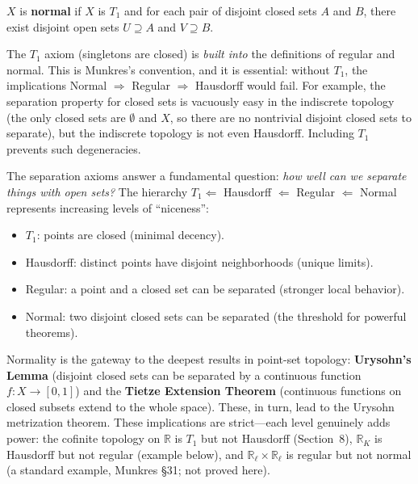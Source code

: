 \documentclass[11pt]{report}
\begin{document}
\begin{defbox}[Normal]
$X$ is \textbf{normal} if $X$ is $T_1$ and for each pair of disjoint closed sets $A$ and $B$, there exist disjoint open sets $U \supseteq A$ and $V \supseteq B$.
\end{defbox}

\begin{rembox}
The $T_1$ axiom (singletons are closed) is \emph{built into} the definitions of regular and normal. This is Munkres's convention, and it is essential: without $T_1$, the implications Normal $\Rightarrow$ Regular $\Rightarrow$ Hausdorff would fail. For example, the separation property for closed sets is vacuously easy in the indiscrete topology (the only closed sets are $\emptyset$ and $X$, so there are no nontrivial disjoint closed sets to separate), but the indiscrete topology is not even Hausdorff. Including $T_1$ prevents such degeneracies.
\end{rembox}

\begin{rembox}
The separation axioms answer a fundamental question: \emph{how well can we separate things with open sets?} The hierarchy $T_1 \Leftarrow$ Hausdorff $\Leftarrow$ Regular $\Leftarrow$ Normal represents increasing levels of ``niceness'':
\begin{itemize}
    \item $T_1$: points are closed (minimal decency).
    \item Hausdorff: distinct points have disjoint neighborhoods (unique limits).
    \item Regular: a point and a closed set can be separated (stronger local behavior).
    \item Normal: two disjoint closed sets can be separated (the threshold for powerful theorems).
\end{itemize}
Normality is the gateway to the deepest results in point-set topology: \textbf{Urysohn's Lemma} (disjoint closed sets can be separated by a continuous function $f: X \to [0,1]$) and the \textbf{Tietze Extension Theorem} (continuous functions on closed subsets extend to the whole space). These, in turn, lead to the Urysohn metrization theorem. These implications are strict---each level genuinely adds power: the cofinite topology on $\mathbb{R}$ is $T_1$ but not Hausdorff (Section~8), $\mathbb{R}_K$ is Hausdorff but not regular (example below), and $\mathbb{R}_\ell \times \mathbb{R}_\ell$ is regular but not normal (a standard example, Munkres \S31; not proved here).
\end{rembox}
\end{document}
